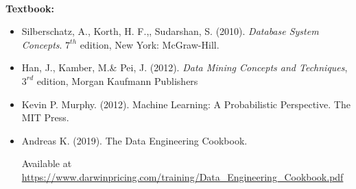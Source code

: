 \documentclass[11pt]{article}
\begin{document}
	\\
	
	

	

	\textbf {\large Textbook:} 
\begin{itemize}
	\item Silberschatz, A., Korth, H. F.,, Sudarshan, S. (2010). \textit{Database System Concepts}. $7^{th}$ edition, New York: McGraw-Hill.
	\item  Han, J., Kamber, M.\& Pei, J. (2012). \textit{Data Mining Concepts and Techniques}, $3^{rd}$ edition, Morgan Kaufmann Publishers
	\item Kevin P. Murphy. (2012). Machine Learning: A Probabilistic Perspective. The MIT Press.
	
	\item  Andreas K. (2019). The Data Engineering Cookbook.
	
	 Available at 
	\href{Cook Book}{https://www.darwinpricing.com/training/Data\_Engineering\_Cookbook.pdf}
\end{itemize}  
\end{document}
